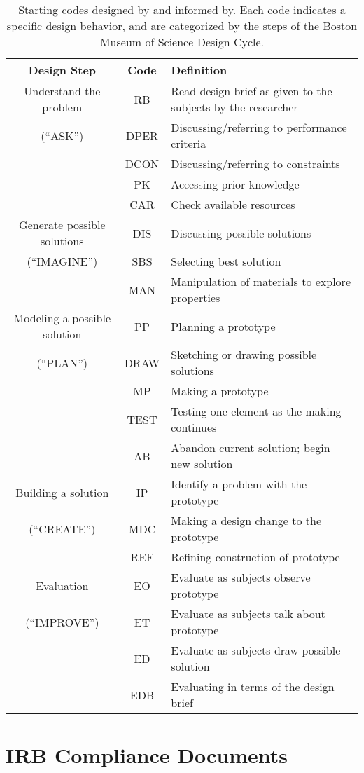 %
\begin{table}
\begin{centering}
\begin{tabular}{|c|c| p{2.5in} |}
\hline
Design Step & Code & Definition\tabularnewline
\hline
Understand the problem & RB & Read design brief as given to the subjects by the researcher\tabularnewline
\cline{2-3}
({}``ASK'') & DPER & Discussing/referring to performance criteria\tabularnewline
\cline{2-3}
 & DCON & Discussing/referring to constraints\tabularnewline
\cline{2-3}
 & PK & Accessing prior knowledge\tabularnewline
\cline{2-3}
 & CAR & Check available resources\tabularnewline
\hline
Generate possible solutions & DIS & Discussing possible solutions\tabularnewline
\cline{2-3}
({}``IMAGINE'') & SBS & Selecting best solution\tabularnewline
\cline{2-3}
 & MAN & Manipulation of materials to explore properties\tabularnewline
\hline
Modeling a possible solution & PP & Planning a prototype\tabularnewline
\cline{2-3}
({}``PLAN'') & DRAW & Sketching or drawing possible solutions\tabularnewline
\cline{2-3}
 & MP & Making a prototype\tabularnewline
\cline{2-3}
 & TEST & Testing one element as the making continues\tabularnewline
\cline{2-3}
 & AB & Abandon current solution; begin new solution\tabularnewline
\hline
Building a solution & IP & Identify a problem with the prototype\tabularnewline
\cline{2-3}
({}``CREATE'') & MDC & Making a design change to the prototype\tabularnewline
\cline{2-3}
 & REF & Refining construction of prototype\tabularnewline
\hline
Evaluation & EO & Evaluate as subjects observe prototype\tabularnewline
\cline{2-3}
({}``IMPROVE'') & ET & Evaluate as subjects talk about prototype\tabularnewline
\cline{2-3}
 & ED & Evaluate as subjects draw possible solution\tabularnewline
\cline{2-3}
 & EDB & Evaluating in terms of the design brief\tabularnewline
\hline
\end{tabular}
\par

\end{centering}

\caption[Starting codes.]{Starting codes designed by and informed by. Each code indicates a specific design behavior, and are categorized by the steps of the Boston Museum of Science Design Cycle.}

\label{tab:starting-codes}

\end{table}

\chapter{IRB Compliance Documents}


